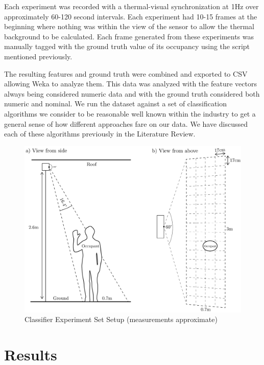 \documentclass[../thesis/thesis.tex]{subfiles}
\begin{document}
Each experiment was recorded with a thermal-visual synchronization at 1Hz over approximately 60-120 second intervals. Each experiment had 10-15 frames at the beginning where nothing was within the view of the sensor to allow the thermal background to be calculated. Each frame generated from these experiments was manually tagged with the ground truth value of its occupancy using the script mentioned previously.

The resulting features and ground truth were combined and exported to CSV allowing Weka to analyze them. This data was analyzed with the feature vectors always being considered numeric data and with the ground truth considered both numeric and nominal. We run the dataset against a set of classification algorithms we consider to be reasonable well known within the industry to get a general sense of how different approaches fare on our data. We have discussed each of these algorithms previously in the Literature Review.

\begin{landscape}
 \begin{figure}
 \centering
 \includegraphics[height=\textheight]{../diagrams/third-exp-setup2.pdf}
 \caption{Classifier Experiment Set Setup (measurements approximate)}
 \label{fig:exps:3setup}
 \end{figure}
\end{landscape}

\section{Results}
\label{sec:results}
\end{document}
